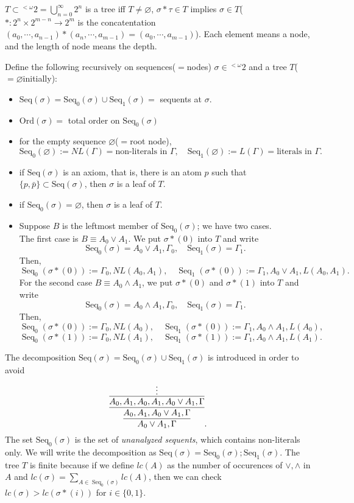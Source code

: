 \documentclass{../../small}
\DeclareMathOperator{\Seq}{Seq}
\begin{document}
\begin{pf}
$T\subset{}^{<\omega}2=\bigcup_{n=0}^\infty 2^n$ is a tree iff $T\ne\varnothing$, $\sigma*\tau\in T$ implies $\sigma\in T$($*:2^n\times 2^{m-n}\to 2^m$ is the concatentation $(a_0,\cdots,a_{n-1})*(a_n,\cdots,a_{m-1})=(a_0,\cdots,a_{m-1})$).
Each element means a node, and the length of node means the depth.

Define the following recursively on sequences($=$nodes)  $\sigma\in{}^{<\omega}2$ and a tree $T$($=\varnothing$initially):
\begin{itemize}
\item $\mathrm{Seq}(\sigma)=\mathrm{Seq}_0(\sigma)\cup\mathrm{Seq}_1(\sigma)=$ sequents at $\sigma$.
\item $\mathrm{Ord}(\sigma)=$ total order on $\mathrm{Seq}_0(\sigma)$
\item for the empty sequence $\varnothing$($=$root node),
\[\mathrm{Seq}_0(\varnothing):=NL(\Gamma)=\text{non-literals in $\Gamma$},\quad\mathrm{Seq}_1(\varnothing):=L(\Gamma)=\text{literals in $\Gamma$}.\]
\item if $\mathrm{Seq}(\sigma)$ is an axiom, that is, there is an atom $p$ such that $\{p,\bar p\}\subset\mathrm{Seq}(\sigma)$, then $\sigma$ is a leaf of $T$.
\item if $\mathrm{Seq}_0(\sigma)=\varnothing$, then $\sigma$ is a leaf of $T$.
\item Suppose $B$ is the leftmost member of $\mathrm{Seq}_0(\sigma)$; we have two cases.\\
The first case is $B\equiv A_0\vee A_1$.
We put $\sigma*(0)$ into $T$ and write
\[\mathrm{Seq}_0(\sigma)=A_0\vee A_1,\Gamma_0,\quad\mathrm{Seq}_1(\sigma)=\Gamma_1.\]
Then,
\[\Seq_0(\sigma*(0)):=\Gamma_0,NL(A_0,A_1),\quad\Seq_1(\sigma*(0)):=\Gamma_1,A_0\vee A_1,L(A_0,A_1).\]
For the second case $B\equiv A_0\wedge A_1$, we put $\sigma*(0)$ and $\sigma*(1)$ into $T$ and write
\[\mathrm{Seq}_0(\sigma)=A_0\wedge A_1,\Gamma_0,\quad\mathrm{Seq}_1(\sigma)=\Gamma_1.\]
Then,
\[\Seq_0(\sigma*(0)):=\Gamma_0,NL(A_0),\quad\Seq_1(\sigma*(0)):=\Gamma_1,A_0\wedge A_1,L(A_0),\]
\[\Seq_0(\sigma*(1)):=\Gamma_0,NL(A_1),\quad\Seq_1(\sigma*(1)):=\Gamma_1,A_0\wedge A_1,L(A_1).\]
\end{itemize}
The decomposition $\mathrm{Seq}(\sigma)=\mathrm{Seq}_0(\sigma)\cup\mathrm{Seq}_1(\sigma)$ is introduced in order to avoid
\[\infer{A_0\vee A_1,\Gamma}{\infer{A_0,A_1,A_0\vee A_1,\Gamma}{\infer{A_0,A_1,A_0,A_1,A_0\vee A_1,\Gamma}{\vdots}}}.\]
The set $\mathrm{Seq}_0(\sigma)$ is the set of \emph{unanalyzed sequents}, which contains non-literals only.
We will write the decomposition as $\mathrm{Seq}(\sigma)=\mathrm{Seq}_0(\sigma);\mathrm{Seq}_1(\sigma)$.
The tree $T$ is finite because if we define $lc(A)$ as the number of occurences of $\vee,\wedge$ in $A$ and $lc(\sigma)=\sum_{A\in\Seq_0(\sigma)} lc(A)$, then we can check $lc(\sigma)>lc(\sigma*(i))$ for $i\in\{0,1\}$.


\end{pf}
\end{document}
